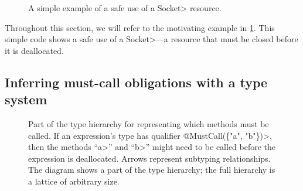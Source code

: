 \begin{figure}
  
  \caption{A simple example of a safe use of a \<Socket> resource.}
  \label{fig:example}
\end{figure}

\noindent
Throughout this section, we will refer to the motivating example
in \cref{fig:example}. This simple code shows
a safe use of a \<Socket>---a resource that must be closed before
it is deallocated.

\subsection{Inferring must-call obligations with a type system}
\label{sec:must-call}

\begin{figure}

\caption{Part of the type hierarchy for representing which methods must be
  called.
  If an expression's type has qualifier \<@Must\-Call(\{"a", "b"\})>, then
  the methods ``\<a>'' and ``\<b>'' might need to be called before the
  expression is deallocated.
  Arrows represent
  subtyping relationships.
  The diagram shows a part of the type hierarchy; the full hierarchy is a
  lattice of arbitrary size. 
}
\label{fig:must-call-hierarchy}
\end{figure}

